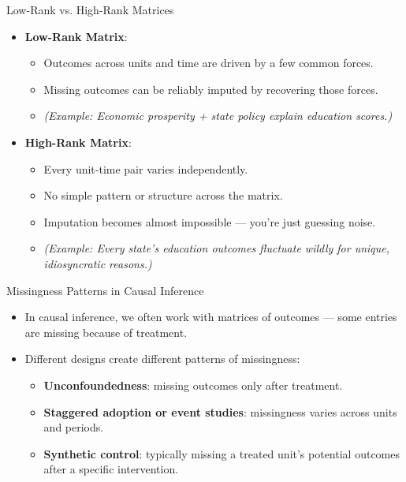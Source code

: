 \documentclass{beamer}
\begin{document}
\begin{frame}{Low-Rank vs. High-Rank Matrices}
\small
\begin{itemize}
  \item \textbf{Low-Rank Matrix}:
  \begin{itemize}
    \item Outcomes across units and time are driven by a few common forces.
    \item Missing outcomes can be reliably imputed by recovering those forces.
    \item \textit{(Example: Economic prosperity + state policy explain education scores.)}
  \end{itemize}
  \vspace{0.3cm}
  \item \textbf{High-Rank Matrix}:
  \begin{itemize}
    \item Every unit-time pair varies independently.
    \item No simple pattern or structure across the matrix.
    \item Imputation becomes almost impossible — you're just guessing noise.
    \item \textit{(Example: Every state's education outcomes fluctuate wildly for unique, idiosyncratic reasons.)}
  \end{itemize}
\end{itemize}
\end{frame}



\begin{frame}{Missingness Patterns in Causal Inference}
\small
\begin{itemize}
  \item In causal inference, we often work with matrices of outcomes — some entries are missing because of treatment.
  \item Different designs create different patterns of missingness:
  \begin{itemize}
    \item \textbf{Unconfoundedness}: missing outcomes only after treatment.
    \item \textbf{Staggered adoption or event studies}: missingness varies across units and periods.
    \item \textbf{Synthetic control}: typically missing a treated unit’s potential outcomes after a specific intervention.
  \end{itemize}
\end{itemize}
\end{frame}
\end{document}
